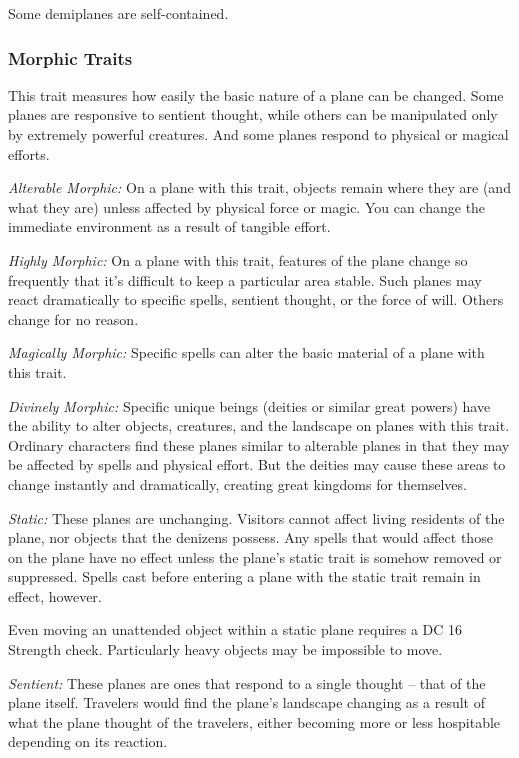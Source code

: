 Some demiplanes are self-contained.

\subsubsection{Morphic Traits}

This trait measures how easily the basic nature of a plane 
can be changed. Some planes are responsive to sentient thought, while others can 
be manipulated only by extremely powerful creatures. And some planes respond to 
physical or magical efforts.

\textit{Alterable Morphic:} On a plane with this trait, objects remain where they 
are (and what they are) unless affected by physical force or magic. You can change 
the immediate environment as a result of tangible effort. 

\textit{Highly Morphic:} On a plane with this trait, features of the plane change 
so frequently that it's difficult to keep a particular area stable. Such planes 
may react dramatically to specific spells, sentient thought, or the force of will. 
Others change for no reason. 

\textit{Magically Morphic:} Specific spells can alter the basic material of a plane 
with this trait.

\textit{Divinely Morphic:} Specific unique beings (deities or similar great powers) 
have the ability to alter objects, creatures, and the landscape on planes with 
this trait. Ordinary characters find these planes similar to alterable planes in 
that they may be affected by spells and physical effort. But the deities may cause 
these areas to change instantly and dramatically, creating great kingdoms for themselves. 

\textit{Static:} These planes are unchanging. Visitors cannot affect living residents 
of the plane, nor objects that the denizens possess. Any spells that would affect 
those on the plane have no effect unless the plane's static trait is somehow removed 
or suppressed. Spells cast before entering a plane with the static trait remain 
in effect, however.

Even moving an unattended object within a static plane requires a DC 16 Strength 
check. Particularly heavy objects may be impossible to move.

\textit{Sentient:} These planes are ones that respond to a single thought -- that 
of the plane itself. Travelers would find the plane's landscape changing as a result 
of what the plane thought of the travelers, either becoming more or less hospitable 
depending on its reaction.


